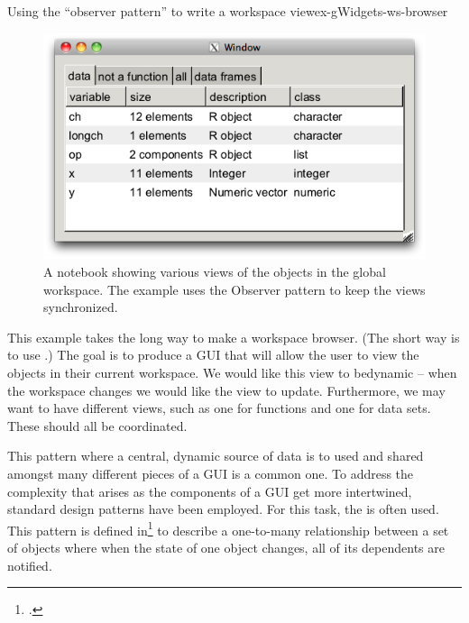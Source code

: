 \begin{example}{Using the ``observer pattern'' to write a workspace view}{ex-gWidgets-ws-browser}
\begin{figure}
  \centering
  \includegraphics[width=.6\textwidth]{fig-gWidgets-ws-browser.png}
  \caption{A notebook showing various views of the objects in the global workspace. The example uses the Observer pattern to keep the views synchronized.}
  \label{fig:gWidgets-ws-browser}
\end{figure}
This example takes the long way to make a workspace browser. (The
short way is to use .) The goal is to produce
a GUI that will allow the user to view the objects in their current
workspace. We would like this view to bedynamic -- when the workspace
changes we would like the view to update. Furthermore, we may want to
have different views, such as one for functions and one for data
sets. These should all be coordinated.


This pattern where a central, dynamic source of data is to used and
shared amongst many different pieces of a GUI is a common one. To
address the complexity that arises as the components of a GUI get more
intertwined, standard design patterns have been employed. For this
task, the  is often used. This pattern is
defined in\footcite{head-first-design-patterns} to describe a
one-to-many relationship between a set of objects where when the state
of one object changes, all of its dependents are notified.





\end{example}
